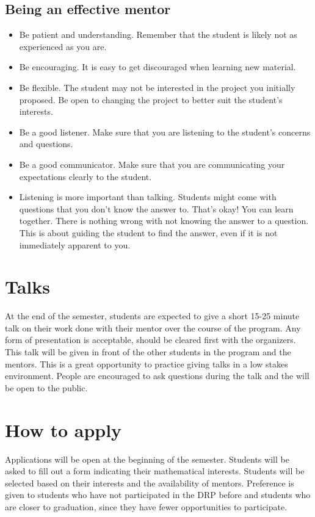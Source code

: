 \documentclass{article}
\begin{document}
\subsection{Being an effective mentor}

\begin{itemize}
    \item Be patient and understanding. Remember that the student is likely not as experienced as you are.
    \item Be encouraging. It is easy to get discouraged when learning new material. 
    \item Be flexible. The student may not be interested in the project you initially proposed. Be open to changing the project to better suit the student's interests.
    \item Be a good listener. Make sure that you are listening to the student's concerns and questions.
    \item Be a good communicator. Make sure that you are communicating your expectations clearly to the student.
    \item Listening is more important than talking. Students might come with questions that you
      don't know the answer to. That's okay! You can learn together. There is nothing wrong with not
      knowing the answer to a question. This is about guiding the student to find the answer, even
      if it is not immediately apparent to you. 
\end{itemize}


\section{Talks}

At the end of the semester, students are expected to give a short 15-25 minute talk on their work
done with their mentor over the course of the program. Any form of presentation is acceptable,
should be cleared first with the organizers. This talk will be given in front of the other students
in the program and the mentors. This is a great opportunity to practice giving talks in a low
stakes environment. People are encouraged to ask questions during the talk and the will be open to
the public.

\section{How to apply}

Applications will be open at the beginning of the semester. Students will be asked to fill out a
form indicating their mathematical interests. Students will be selected based on their interests and
the availability of mentors. Preference is given to students who have not participated in the DRP
before and students who are closer to graduation, since they have fewer opportunities to
participate. 
\end{document}
